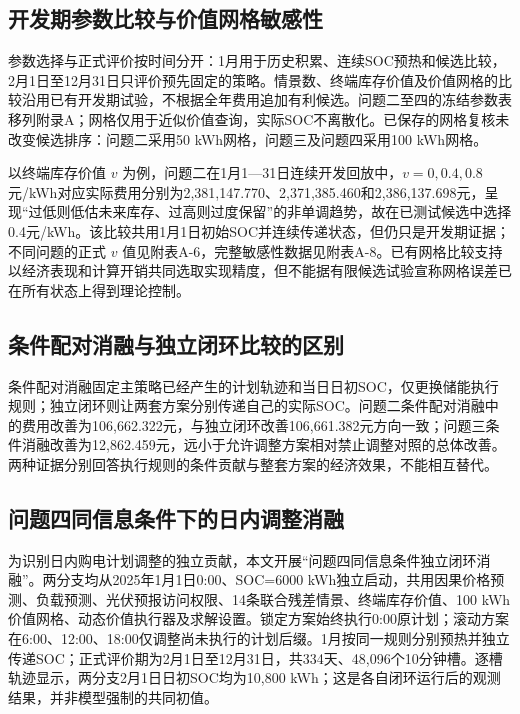 \documentclass[zihao=-4,a4paper,UTF8,fontset=none]{ctexart}
\begin{document}
\subsection{开发期参数比较与价值网格敏感性}\label{ux5f00ux53d1ux671fux53c2ux6570ux6bd4ux8f83ux4e0eux4ef7ux503cux7f51ux683cux654fux611fux6027}

参数选择与正式评价按时间分开：1月用于历史积累、连续SOC预热和候选比较，2月1日至12月31日只评价预先固定的策略。情景数、终端库存价值及价值网格的比较沿用已有开发期试验，不根据全年费用追加有利候选。问题二至四的冻结参数表移列附录A；网格仅用于近似价值查询，实际SOC不离散化。已保存的网格复核未改变候选排序：问题二采用50 kWh网格，问题三及问题四采用100 kWh网格。

以终端库存价值 \(v\) 为例，问题二在1月1---31日连续开发回放中，\(v=0,0.4,0.8\) 元/kWh对应实际费用分别为2,381,147.770、2,371,385.460和2,386,137.698元，呈现``过低则低估未来库存、过高则过度保留''的非单调趋势，故在已测试候选中选择0.4元/kWh。该比较共用1月1日初始SOC并连续传递状态，但仍只是开发期证据；不同问题的正式 \(v\) 值见附表A-6，完整敏感性数据见附表A-8。已有网格比较支持以经济表现和计算开销共同选取实现精度，但不能据有限候选试验宣称网格误差已在所有状态上得到理论控制。

\subsection{条件配对消融与独立闭环比较的区别}\label{ux6761ux4ef6ux914dux5bf9ux6d88ux878dux4e0eux72ecux7acbux95edux73afux6bd4ux8f83ux7684ux533aux522b}

条件配对消融固定主策略已经产生的计划轨迹和当日日初SOC，仅更换储能执行规则；独立闭环则让两套方案分别传递自己的实际SOC。问题二条件配对消融中的费用改善为106,662.322元，与独立闭环改善106,661.382元方向一致；问题三条件消融改善为12,862.459元，远小于允许调整方案相对禁止调整对照的总体改善。两种证据分别回答执行规则的条件贡献与整套方案的经济效果，不能相互替代。

\subsection{问题四同信息条件下的日内调整消融}\label{ux95eeux9898ux56dbux540cux4fe1ux606fux6761ux4ef6ux4e0bux7684ux65e5ux5185ux8c03ux6574ux6d88ux878d}

为识别日内购电计划调整的独立贡献，本文开展``问题四同信息条件独立闭环消融''。两分支均从2025年1月1日0:00、SOC=6000 kWh独立启动，共用因果价格预测、负载预测、光伏预报访问权限、14条联合残差情景、终端库存价值、100 kWh价值网格、动态价值执行器及求解设置。锁定方案始终执行0:00原计划；滚动方案在6:00、12:00、18:00仅调整尚未执行的计划后缀。1月按同一规则分别预热并独立传递SOC；正式评价期为2月1日至12月31日，共334天、48,096个10分钟槽。逐槽轨迹显示，两分支2月1日日初SOC均为10,800 kWh；这是各自闭环运行后的观测结果，并非模型强制的共同初值。
\end{document}
